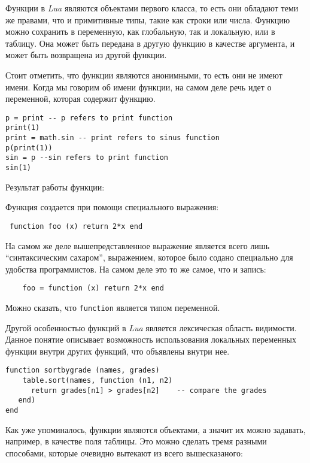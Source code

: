 Функции в \emph{Lua} являются объектами первого класса, то есть они обладают теми же правами, что и примитивные типы, такие как строки или числа. Функцию можно сохранить в переменную, как глобальную, так и локальную, или в таблицу. Она может быть передана в другую функцию в качестве аргумента, и может быть возвращена из другой функции.

Стоит отметить, что функции являются анонимными, то есть они не имеют имени. Когда мы говорим об имени функции, на самом деле речь идет о переменной, которая содержит функцию. 

\begin{lstlisting}
p = print -- p refers to print function
print(1)
print = math.sin -- print refers to sinus function
p(print(1))
sin = p --sin refers to print function
sin(1)
\end{lstlisting}

Результат работы функции:

Функция создается при помощи специального выражения:
\begin{lstlisting}
 function foo (x) return 2*x end
\end{lstlisting}

На самом же деле вышепредставленное выражение является всего лишь ``синтаксическим сахаром'', выражением, которое было содано специально для удобства программистов. На самом деле это то же самое, что и запись:

\begin{lstlisting}
	foo = function (x) return 2*x end
\end{lstlisting}

Можно сказать, что \lstinline{function} является типом переменной. 

Другой особенностью функций в \emph{Lua} является лексическая область видимости. Данное понятие описывает возможность использования локальных переменных функции внутри других функций, что объявлены внутри нее.

\begin{lstlisting}
function sortbygrade (names, grades)
    table.sort(names, function (n1, n2)
      return grades[n1] > grades[n2]    -- compare the grades
   end)
end
\end{lstlisting}  


Как уже упоминалось, функции являются объектами, а значит их можно задавать, например, в качестве поля таблицы. Это можно сделать тремя разными способами, которые очевидно вытекают из всего вышесказаного:

